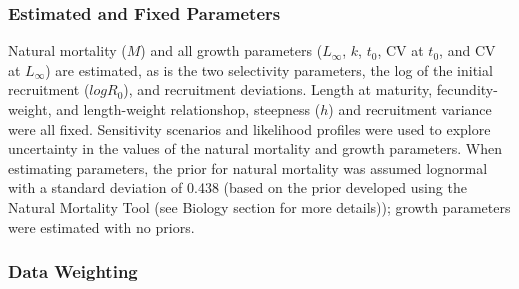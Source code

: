 \documentclass[11pt,
  english,
  a4paper,
]{article}
\begin{document}
\hypertarget{estimated-and-fixed-parameters}{%
\subsubsection{Estimated and Fixed Parameters}\label{estimated-and-fixed-parameters}}

\leavevmode\tagmcend\tagstructend


Natural mortality ({\(M\)\leavevmode\tagmcend\tagstructend}) and all growth parameters ({\(L_{\infty}\)\leavevmode\tagmcend\tagstructend}, {\(k\)\leavevmode\tagmcend\tagstructend}, {\(t_0\)\leavevmode\tagmcend\tagstructend}, CV at {\(t_0\)\leavevmode\tagmcend\tagstructend}, and CV at {\(L_{\infty}\)\leavevmode\tagmcend\tagstructend}) are estimated, as is the two selectivity parameters, the log of the initial recruitment ({\(logR_0\)\leavevmode\tagmcend\tagstructend}), and recruitment deviations. Length at maturity, fecundity-weight, and length-weight relationshop, steepness ({\(h\)\leavevmode\tagmcend\tagstructend}) and recruitment variance were all fixed. Sensitivity scenarios and likelihood profiles were used to explore uncertainty in the values of the natural mortality and growth parameters. When estimating parameters, the prior for natural mortality was assumed lognormal with a standard deviation of 0.438 (based on the prior developed using the Natural Mortality Tool (see Biology section for more details)); growth parameters were estimated with no priors.

\leavevmode\tagmcend\tagstructend\par


\hypertarget{data-weighting}{%
\subsubsection{Data Weighting}\label{data-weighting}}

\leavevmode\tagmcend\tagstructend

\end{document}
